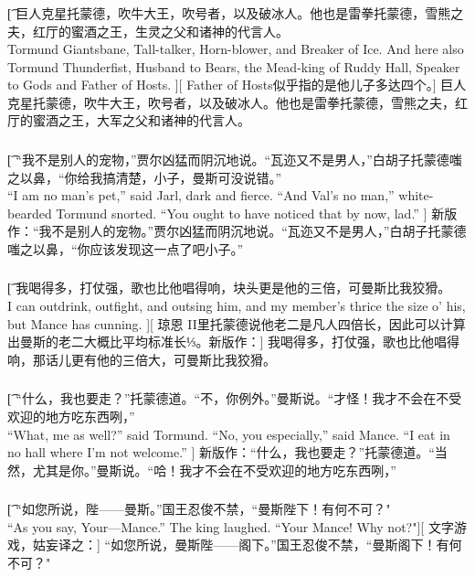 \documentclass[12pt,a4paper]{article}
\begin{document}
\subsubsection{}\t[
	巨人克星托蒙德，吹牛大王，吹号者，以及破冰人。他也是雷拳托蒙德，雪熊之夫，红厅的蜜酒之王，生灵之父和诸神的代言人。\\
	Tormund Giantsbane, Tall-talker, Horn-blower, and Breaker of Ice. And here also Tormund Thunderfist, Husband to Bears, the Mead-king of Ruddy Hall, Speaker to Gods and Father of Hosts. ][
	Father of Hosts似乎指的是他儿子多达四个。]
	巨人克星托蒙德，吹牛大王，吹号者，以及破冰人。他也是雷拳托蒙德，雪熊之夫，红厅的蜜酒之王，大军之父和诸神的代言人。
	
\subsubsection{}\t[
	“我不是别人的宠物，”贾尔凶猛而阴沉地说。“瓦迩又不是男人，”白胡子托蒙德嗤之以鼻，“你给我搞清楚，小子，曼斯可没说错。”\\
	“I am no man's pet,” said Jarl, dark and fierce. “And Val's no man,” white-bearded Tormund snorted. “You ought to have noticed that by now, lad.” ]
	新版作：“我不是别人的宠物。”贾尔凶猛而阴沉地说。“瓦迩又不是男人，”白胡子托蒙德嗤之以鼻，“你应该发现这一点了吧小子。”
	
\subsubsection{}\t[
	我喝得多，打仗强，歌也比他唱得响，块头更是他的三倍，可曼斯比我狡猾。\\
	I can outdrink, outfight, and outsing him, and my member's thrice the size o' his, but Mance has cunning. ][
	琼恩 II里托蒙德说他老二是凡人四倍长，因此可以计算出曼斯的老二大概比平均标准长⅓。新版作：]
	我喝得多，打仗强，歌也比他唱得响，那话儿更有他的三倍大，可曼斯比我狡猾。
	
\subsubsection{}\t[
	“什么，我也要走？”托蒙德道。“不，你例外。”曼斯说。“才怪！我才不会在不受欢迎的地方吃东西咧，”\\
	“What, me as well?” said Tormund. “No, you especially,” said Mance. “I eat in no hall where I'm not welcome.” ]
	新版作：“什么，我也要走？”托蒙德道。“当然，尤其是你。”曼斯说。“哈！我才不会在不受欢迎的地方吃东西咧，”
	
	
\subsubsection{}\t[
	“如您所说，陛——曼斯。”国王忍俊不禁，“曼斯陛下！有何不可？"\\
	“As you say, Your—Mance.” The king laughed. “Your Mance! Why not?"][
	文字游戏，姑妄译之：]
	“如您所说，曼斯陛——阁下。”国王忍俊不禁，“曼斯阁下！有何不可？"
	
\end{document}
